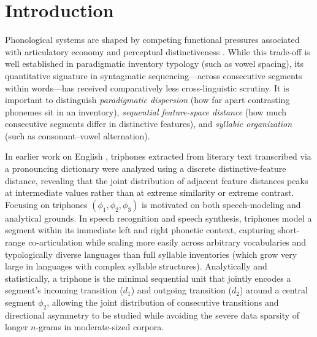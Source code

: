 \documentclass[11pt,a4paper,leqno]{article}
\begin{document}
\bigskip

\section{Introduction}
Phonological systems are shaped by competing functional pressures associated with articulatory economy and perceptual distinctiveness \citep{zipf1949,lindblom1990,flemming2004}. While this trade-off is well established in paradigmatic inventory typology (such as vowel spacing), its quantitative signature in syntagmatic sequencing---across consecutive segments within words---has received comparatively less cross-linguistic scrutiny. It is important to distinguish \emph{paradigmatic dispersion} (how far apart contrasting phonemes sit in an inventory), \emph{sequential feature-space distance} (how much consecutive segments differ in distinctive features), and \emph{syllabic organization} (such as consonant--vowel alternation).

In earlier work on English \citep{araujo2013thesis}, triphones extracted from literary text transcribed via a pronouncing dictionary were analyzed using a discrete distinctive-feature distance, revealing that the joint distribution of adjacent feature distances peaks at intermediate values rather than at extreme similarity or extreme contrast. Focusing on triphones $(\phi_1, \phi_2, \phi_3)$ is motivated on both speech-modeling and analytical grounds. In speech recognition and speech synthesis, triphones model a segment within its immediate left and right phonetic context, capturing short-range co-articulation while scaling more easily across arbitrary vocabularies and typologically diverse languages than full syllable inventories (which grow very large in languages with complex syllable structures). Analytically and statistically, a triphone is the minimal sequential unit that jointly encodes a segment's incoming transition ($d_1$) and outgoing transition ($d_2$) around a central segment $\phi_2$, allowing the joint distribution of consecutive transitions and directional asymmetry to be studied while avoiding the severe data sparsity of longer $n$-grams in moderate-sized corpora.
\end{document}
